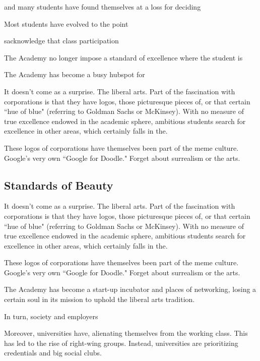 \documentclass[12pt,letterpaper]{article}
\begin{document}
and many students have found themselves at a loss for deciding

Most students have evolved to the point 

sacknowledge that class participation 

The Academy no longer impose a standard of excellence where the student is 

The Academy has become a busy hubspot for 

It doesn't come as a surprise.  The liberal arts.  Part of the fascination with corporations is that they have logos, those picturesque pieces of, or that certain ``hue of blue" (referring to Goldman Sachs or McKinsey).  With no measure of true excellence endowed in the academic sphere, ambitious students search for excellence in other areas, which certainly falls in the.  

These logos of corporations have themselves been part of the meme culture.  Google's very own ``Google for Doodle."  Forget about surrealism or the arts.


\subsection{Standards of Beauty}




It doesn't come as a surprise.  The liberal arts.  Part of the fascination with corporations is that they have logos, those picturesque pieces of, or that certain ``hue of blue" (referring to Goldman Sachs or McKinsey).  With no measure of true excellence endowed in the academic sphere, ambitious students search for excellence in other areas, which certainly falls in the.  

These logos of corporations have themselves been part of the meme culture.  Google's very own ``Google for Doodle."  Forget about surrealism or the arts.


The Academy has become a start-up incubator and places of networking, losing a certain soul in its mission to uphold the liberal arts tradition.


In turn, society and employers 

Moreover, universities have, alienating themselves from the working class.  This has led to the rise of right-wing groups.
Instead, universities are prioritizing credentials and big social clubs. 
\end{document}
